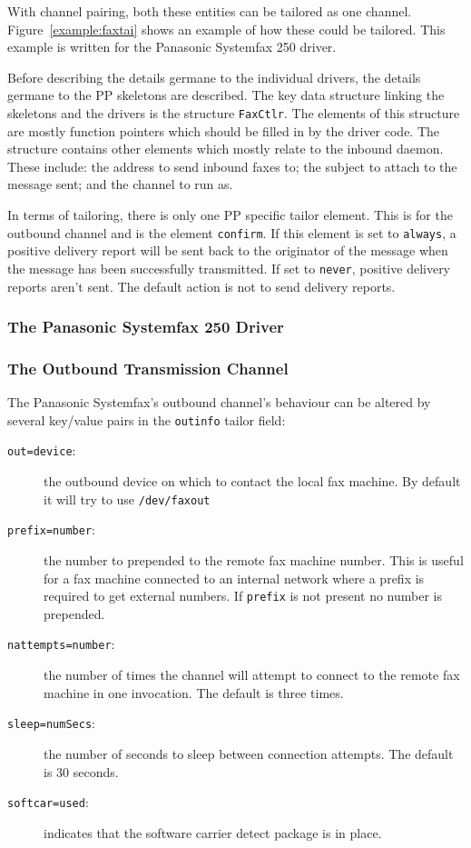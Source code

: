 With channel pairing, both these entities can be tailored as one
channel.
Figure~\ref{example:faxtai} shows an example of how these could be
tailored.
This example is written for the Panasonic Systemfax 250 driver.

Before describing the details germane to the individual drivers,
the details germane to the PP skeletons are described.
The key data structure linking the skeletons and the drivers is the
structure \verb+FaxCtlr+.
The elements of this structure are mostly function pointers which
should be filled in by the driver code.
The structure  contains other elements which mostly relate to the
inbound daemon.
These include: the address to send inbound faxes to; the subject to
attach to the message sent; and the channel to run as.

In terms of tailoring, there is only one PP specific tailor element.
This is for the outbound channel and is the element \verb+confirm+.
If this element is set to \verb+always+, a positive delivery report
will be sent back to the originator of the message when the message
has been successfully transmitted.
If set to \verb+never+, positive delivery reports aren't sent.
The default action is not to send delivery reports.

\subsubsection {The Panasonic Systemfax 250 Driver}

\subsubsection{The Outbound Transmission Channel}

The Panasonic Systemfax's outbound channel's behaviour can be altered
by several key/value pairs in the \verb+outinfo+ tailor field:
\begin{description}
\item[\verb+out=device+:] the outbound device on which to contact the
local fax machine. By default it will try to use \verb+/dev/faxout+

\item[\verb+prefix=number+:] the number to prepended to the remote fax
machine number. This is useful for a fax machine connected to an
internal network where a prefix is required to get external numbers.
If \verb+prefix+ is not present no number is prepended.

\item[\verb+nattempts=number+:] the number of times the channel will
attempt to connect to the remote fax machine in one invocation.
The default is three times.
\item[\verb+sleep=numSecs+:] the number of seconds to sleep between
connection attempts. The default is 30 seconds.
\item[\verb+softcar=used+:] indicates that the software carrier detect
package is in place.
\end{description}

